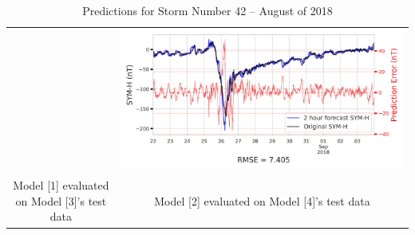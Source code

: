 \documentclass[draft,sw]{agutexSI2019}
\begin{document}
\begin{table}
\begin{tabular}{cc}
&
\includegraphics[width=0.49\linewidth]{paper_plots/2h_swics_model_on_no_swics/2h_swics_model_on_no_swics_storm_42.png}
\\
Model [1] evaluated on Model [3]'s test data & Model [2] evaluated on Model [4]'s test data
\vspace*{12pt}
\\
\end{tabular}
\caption{Predictions for Storm Number 42 -- August of 2018}
\label{storm-42}
\end{table}
\end{document}
